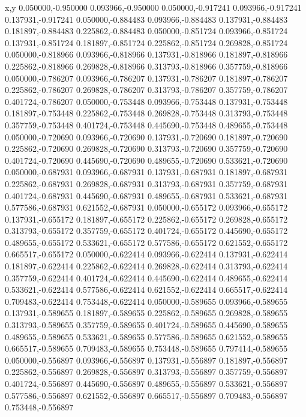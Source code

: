 x,y
0.050000,-0.950000
0.093966,-0.950000
0.050000,-0.917241
0.093966,-0.917241
0.137931,-0.917241
0.050000,-0.884483
0.093966,-0.884483
0.137931,-0.884483
0.181897,-0.884483
0.225862,-0.884483
0.050000,-0.851724
0.093966,-0.851724
0.137931,-0.851724
0.181897,-0.851724
0.225862,-0.851724
0.269828,-0.851724
0.050000,-0.818966
0.093966,-0.818966
0.137931,-0.818966
0.181897,-0.818966
0.225862,-0.818966
0.269828,-0.818966
0.313793,-0.818966
0.357759,-0.818966
0.050000,-0.786207
0.093966,-0.786207
0.137931,-0.786207
0.181897,-0.786207
0.225862,-0.786207
0.269828,-0.786207
0.313793,-0.786207
0.357759,-0.786207
0.401724,-0.786207
0.050000,-0.753448
0.093966,-0.753448
0.137931,-0.753448
0.181897,-0.753448
0.225862,-0.753448
0.269828,-0.753448
0.313793,-0.753448
0.357759,-0.753448
0.401724,-0.753448
0.445690,-0.753448
0.489655,-0.753448
0.050000,-0.720690
0.093966,-0.720690
0.137931,-0.720690
0.181897,-0.720690
0.225862,-0.720690
0.269828,-0.720690
0.313793,-0.720690
0.357759,-0.720690
0.401724,-0.720690
0.445690,-0.720690
0.489655,-0.720690
0.533621,-0.720690
0.050000,-0.687931
0.093966,-0.687931
0.137931,-0.687931
0.181897,-0.687931
0.225862,-0.687931
0.269828,-0.687931
0.313793,-0.687931
0.357759,-0.687931
0.401724,-0.687931
0.445690,-0.687931
0.489655,-0.687931
0.533621,-0.687931
0.577586,-0.687931
0.621552,-0.687931
0.050000,-0.655172
0.093966,-0.655172
0.137931,-0.655172
0.181897,-0.655172
0.225862,-0.655172
0.269828,-0.655172
0.313793,-0.655172
0.357759,-0.655172
0.401724,-0.655172
0.445690,-0.655172
0.489655,-0.655172
0.533621,-0.655172
0.577586,-0.655172
0.621552,-0.655172
0.665517,-0.655172
0.050000,-0.622414
0.093966,-0.622414
0.137931,-0.622414
0.181897,-0.622414
0.225862,-0.622414
0.269828,-0.622414
0.313793,-0.622414
0.357759,-0.622414
0.401724,-0.622414
0.445690,-0.622414
0.489655,-0.622414
0.533621,-0.622414
0.577586,-0.622414
0.621552,-0.622414
0.665517,-0.622414
0.709483,-0.622414
0.753448,-0.622414
0.050000,-0.589655
0.093966,-0.589655
0.137931,-0.589655
0.181897,-0.589655
0.225862,-0.589655
0.269828,-0.589655
0.313793,-0.589655
0.357759,-0.589655
0.401724,-0.589655
0.445690,-0.589655
0.489655,-0.589655
0.533621,-0.589655
0.577586,-0.589655
0.621552,-0.589655
0.665517,-0.589655
0.709483,-0.589655
0.753448,-0.589655
0.797414,-0.589655
0.050000,-0.556897
0.093966,-0.556897
0.137931,-0.556897
0.181897,-0.556897
0.225862,-0.556897
0.269828,-0.556897
0.313793,-0.556897
0.357759,-0.556897
0.401724,-0.556897
0.445690,-0.556897
0.489655,-0.556897
0.533621,-0.556897
0.577586,-0.556897
0.621552,-0.556897
0.665517,-0.556897
0.709483,-0.556897
0.753448,-0.556897
